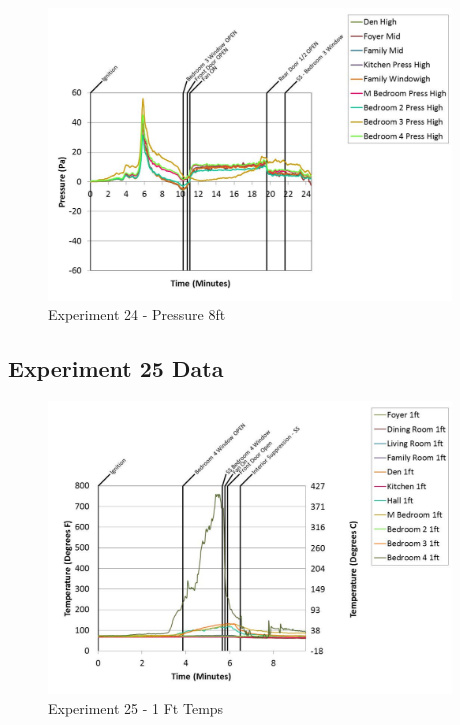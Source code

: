 \documentclass{article}
\begin{document}
\begin{appendices}
	\clearpage

	\begin{figure}[h!]
		\centering
		\includegraphics[height=3.05in]{0_Images/Results_Charts/Exp_24_Charts/Pressure8ft.pdf}
		\caption{Experiment 24 - Pressure 8ft}
	\end{figure}
 

		\clearpage
\clearpage		\large
\subsection{Experiment 25 Data} \label{App:Exp25Results} 

	\begin{figure}[h!]
		\centering
		\includegraphics[height=3.05in]{0_Images/Results_Charts/Exp_25_Charts/1FtTemps.pdf}
		\caption{Experiment 25 - 1 Ft Temps}
	\end{figure}
 


\end{appendices}
\end{document}
